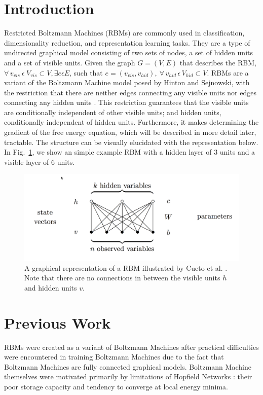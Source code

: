 \documentclass[journal]{IEEEtran}
\begin{document}
\section{Introduction}
Restricted Boltzmann Machines (RBMs) are commonly used in classification, dimensionality reduction, and representation learning tasks. They are a type of undirected graphical model consisting of two sets of nodes, a set of hidden units and a set of visible units.  Given the graph $G = (V,E)$ that describes the RBM, $\forall \, v_{vis} \: \epsilon \: V_{vis} \subset V,\exists e \epsilon E$, such that $ e = (v_{vis}, v_{hid}),\: \forall \, v_{hid} \, \epsilon \, V_{hid} \subset V$.  RBMs are a variant of the Boltzmann Machine model \cite{ackley1985learning} posed by Hinton and Sejnowski, with the restriction that there are neither edges connecting any visible units nor edges connecting any hidden units \cite{hinton2006fast}. This restriction guarantees that the visible units are conditionally independent of other visible units; and hidden units, conditionally independent of hidden units. Furthermore, it makes determining the gradient of the free energy equation, which will be described in more detail later, tractable. The structure can be visually elucidated with the representation below. In Fig.~\ref{rbm}, we show an simple example RBM with a hidden layer of 3 units and a visible layer of 6 units.

\begin{figure}[h]
  \centering
  \includegraphics[width=0.9\linewidth]{rbm.png}
  \caption{A graphical representation of a RBM illustrated by Cueto et al. \cite{cueto2009geometry}. Note that there are no connections in between the visible units $h$ and hidden units $v$.}
  \label{rbm}
\end{figure}

\section{Previous Work}

RBMs were created as a variant of Boltzmann Machines after practical difficulties were encountered in training Boltzmann Machines due to the fact that Boltzmann Machines are fully connected graphical models. Boltzmann Machine themselves were motivated primarily by limitations of Hopfield Networks \cite{hopfield1985neural}: their poor storage capacity and tendency to converge at local energy minima.  
\end{document}
